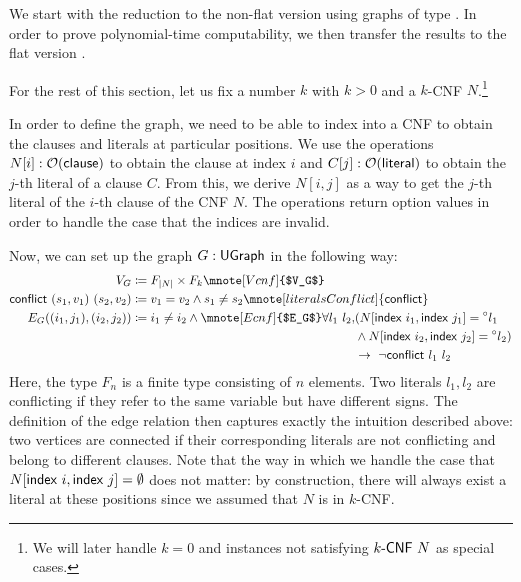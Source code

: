 We start with the reduction to the non-flat version \Clique{} using graphs of type \UGraph{}. In order to prove polynomial-time computability, we then transfer the results to the flat version \FlatClique{}. 

For the rest of this section, let us fix a number $k$ with $k > 0$ and a $k$-CNF $N$.\footnote{We will later handle $k = 0$ and instances not satisfying $\text{$k$-\textsf{CNF}}~N$ as special cases.}

In order to define the graph, we need to be able to index into a CNF to obtain the clauses and literals at particular positions. 
We use the operations $N[i] : \mathcal{O}{(\textsf{clause})}$ to obtain the clause at index $i$ and $C[j] : \mathcal{O}{(\textsf{literal})}$ to obtain the $j$-th literal of a clause $C$.
From this, we derive $N[i, j]$ as a way to get the $j$-th literal of the $i$-th clause of the CNF $N$. The operations return option values in order to handle the case that the indices are invalid.

\newcommand{\literalsConflict}{\textsf{conflict}}
Now, we can set up the graph $G : \textsf{UGraph}$ in the following way: 
\begin{align*} 
  V_G &\defeq F_{\length{N}} \times F_{k}\mnote[Vcnf]{$V_G$} \\
  \literalsConflict~(s_1, v_1)~(s_2, v_2) &\defeq v_1 = v_2 \land s_1 \neq s_2\mnote[literalsConflict]{\literalsConflict}\\
  E_G ((i_1, j_1), (i_2, j_2)) &\defeq i_1 \neq i_2 \land \mnote[Ecnf]{$E_G$}
  \begin{aligned}[t]
    \forall l_1~l_2, &(N[\findex{i_1}, \findex{j_1}] = \OSome{l_1} \\
                     &\land N[\findex{i_2}, \findex{j_2}] = \OSome{l_2}) \\
                     &\rightarrow~\lnot \literalsConflict~l_1~l_2 
  \end{aligned}
\end{align*}
Here, the type $F_n$ is a finite type consisting of $n$ elements. Two literals $l_1, l_2$ are conflicting if they refer to the same variable but have different signs. 
The definition of the edge relation then captures exactly the intuition described above: two vertices are connected if their corresponding literals are not conflicting and belong to different clauses. 
Note that the way in which we handle the case that $N[\textsf{index}~i, \textsf{index}~j] = \emptyset$ does not matter: by construction, there will always exist a literal at these positions since we assumed that $N$ is in $k$-CNF.

